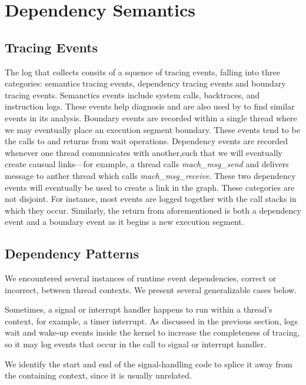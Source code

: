 \section{Dependency Semantics}
\label{sec:dependency-semantics}
\subsection{Tracing Events}
The log that \xxx collects consits of a squence of tracing events, falling into
three categories: semantics tracing events, dependency tracing events and
boundary tracing events.  Semanctics events include system calls, backtraces,
and instruction logs.  These events help diagnosis and are also used by \xxx to
find similar events in its analysis.  Boundary events are recorded within a
single thread where we may eventually place an execution segment boundary.
These events tend to be the calls to and returns from wait operations.
Dependency events are recorded whenever one thread comunnicates with
another,such that we will eventually create causual links---for example, a
thread calls \textit{mach\_msg\_send} and delivers message to anther thread
which calls \textit{mach\_msg\_receive}. These two dependency events will
eventually be used to create a link in the graph.  These categories are not
disjoint.  For instance, most events are logged together with the call stacks
in which they occur.  Similarly, the return from aforementioned
 is both a dependency event and a boundary event as it
begins a new execution segment.

\subsection{Dependency Patterns}
\label{sec:patterns}
We encountered several instances of runtime event dependencies, correct or
incorrect, between thread contexts. We present several generalizable cases
below.


Sometimes, a signal or interrupt handler happens to run within a thread's
context, for example, a timer interrupt.  As discussed in the previous section,
\xxx logs wait and wake-up events inside the kernel to increase the
completeness of tracing, so it may log events that occur in the call to signal
or interrupt handler.

We identify the start and end of the signal-handling code to splice it away
from the containing context, since it is usually unrelated.

